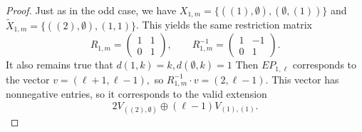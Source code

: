 \documentclass{amsart}
\theoremstyle{plain}
\theoremstyle{definition}
\begin{document}
\begin{proof}
Just as in the odd case, we have $X_{1,m} = \{ ((1), \emptyset) , (\emptyset, (1)) \}$ and $\tilde{X}_{1,m} = \{ ((2), \emptyset), (1, 1) \}$. This yields the same restriction matrix 
$$
    R_{1,m}= \begin{pmatrix}1&1\\0&1\end{pmatrix},
    \qquad R_{1,m}^{-1}= \begin{pmatrix}1&-1\\0&1\end{pmatrix}.
$$
It also remains true that  $d(1,k)=k, d(\emptyset,k)= 1$ Then $EP_{1,\ell}$ corresponds to the vector $v= (\ell+1,\ell-1),$ so 
$R_{1,m}^{-1}\cdot v= (2,\ell-1).$ This vector has nonnegative entries, so it corresponds to the valid extension 
$$2V_{((2),\emptyset)}\oplus (\ell-1)V_{(1),(1)}.
$$
\end{proof}
\end{document}
